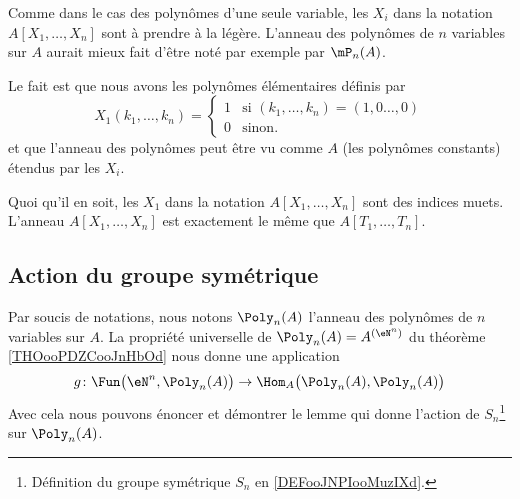 \begin{normaltext}
    Comme dans le cas des polynômes d'une seule variable, les \( X_i\) dans la notation \( A[X_1,\ldots, X_n]\) sont à prendre à la légère. L'anneau des polynômes de \( n\) variables sur \( A\) aurait mieux fait d'être noté par exemple par \( \mP_n(A)\).

    Le fait est que nous avons les polynômes élémentaires définis par
    \begin{equation}
        X_1(k_1,\ldots, k_n)=\begin{cases}
            1    &   \text{si } (k_1,\ldots, k_n)=(1,0\ldots, 0)\\
            0    &    \text{sinon. }
        \end{cases}
    \end{equation}
    et que l'anneau des polynômes peut être vu comme \( A\) (les polynômes constants) étendus par les \( X_i\).

    Quoi qu'il en soit, les \( X_1\) dans la notation \( A[X_1,\ldots, X_n]\) sont des indices muets. L'anneau \( A[X_1,\ldots, X_n]\) est exactement le même que \( A[T_1,\ldots, T_n]\).
\end{normaltext}

\subsection{Action du groupe symétrique}

Par soucis de notations, nous notons \( \Poly_n(A)\) l'anneau des polynômes de \( n\) variables sur \( A\). La propriété universelle de \( \Poly_n(A)=A^{(\eN^n)}\) du théorème \ref{THOooPDZCooJnHbOd} nous donne une application
\begin{equation}
    g\colon \Fun\big(\eN^n,\Poly_n(A)\big)\to \Hom_A\big( \Poly_n(A),\Poly_n(A) \big)
\end{equation}
Avec cela nous pouvons énoncer et démontrer le lemme qui donne l'action de \( S_n\)\footnote{Définition du groupe symétrique \( S_n\) en \ref{DEFooJNPIooMuzIXd}.} sur \( \Poly_n(A)\).

